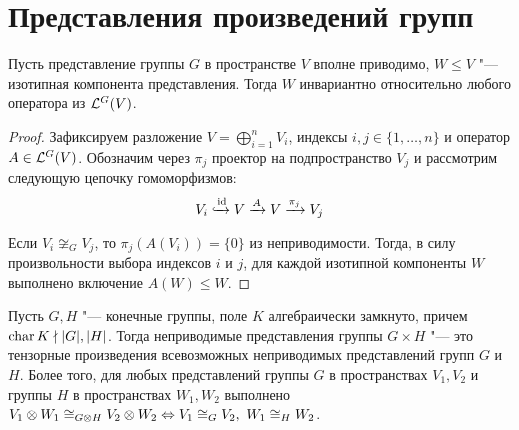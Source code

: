 \section{Представления произведений групп}

\begin{proposition}
	Пусть представление группы $G$ в пространстве $V$ вполне приводимо, $W \le V$ "--- изотипная компонента представления. Тогда $W$ инвариантно относительно любого оператора из $\mathcal L^G(V)$.
\end{proposition}

\begin{proof}
	Зафиксируем разложение $V = \bigoplus_{i=1}^n V_i$, индексы $i, j \in \{1, \dotsc, n\}$ и оператор $A \in \mathcal L^G(V)$. Обозначим через $\pi_j$ проектор на подпространство $V_j$ и рассмотрим следующую цепочку гомоморфизмов:
	\[V_i \xhookrightarrow[]{\mathrm{id}} V \xrightarrow{A} V \xrightarrow{\pi_j} V_j\]
	
	Если $V_i \not\cong_G V_j$, то $\pi_j(A(V_i)) = \{0\}$ из неприводимости. Тогда, в силу произвольности выбора индексов $i$ и $j$, для каждой изотипной компоненты $W$ выполнено включение $A(W) \le W$.
\end{proof}

\begin{theorem}
	Пусть $G, H$ "--- конечные группы, поле $K$ алгебраически замкнуто, причем $\operatorname{char}{K} \nmid |G|, |H|$. Тогда неприводимые представления группы $G \times H$ "--- это тензорные произведения всевозможных неприводимых представлений групп $G$ и $H$. Более того, для любых представлений группы $G$ в пространствах $V_1, V_2$ и группы $H$ в пространствах $W_1, W_2$ выполнено $V_1 \otimes W_1 \cong_{G \otimes H} V_2 \otimes W_2 \Leftrightarrow V_1 \cong_G V_2,~ W_1\cong_H W_2$.
\end{theorem}

